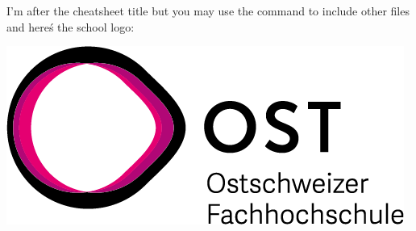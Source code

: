 \documentclass[8pt, a4paper, twoside, landscape]{extarticle}
\begin{document}
    \begin{multicols}{3}
        \raggedcolumns
        \cheatsheettitle
       I'm after the cheatsheet title but you may use the \verb!! command to include other files
       and hereś the school logo:
        \begin{center}
            \includegraphics[width=0.5\columnwidth]{Images/OSTLogo.png}
        \end{center}

        
    \end{multicols}
\end{document}
